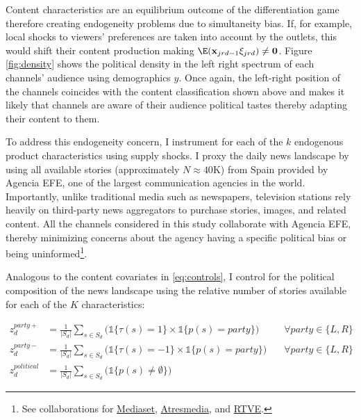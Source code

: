 \documentclass[12pt]{article}
\begin{document}
	
	Content characteristics are an equilibrium outcome of the differentiation game therefore creating endogeneity problems due to simultaneity bias. If, for example, local shocks to viewers' preferences are taken into account by the outlets, this would shift their content production making $\E(\mathbf{x}_{jrd-1}\xi_{jrd})\neq \mathbf{0} $.  Figure \ref{fig:density} shows the political density in the left right spectrum of each channels' audience using demographics $y$. Once again, the left-right position of the channels coincides with the content classification shown above and makes it likely that channels are aware of their audience political tastes thereby adapting their content to them. 
	

	
	To address this endogeneity concern, I instrument for each of the $k$ endogenous product characteristics using supply shocks. I proxy the daily news landscape by using all available stories (approximately $N\approx40\text{K}$) from Spain provided by Agencia EFE, one of the largest communication agencies in the world. Importantly, unlike traditional media such as newspapers, television stations rely heavily on third-party news aggregators to purchase stories, images, and related content.	All the channels considered in this study collaborate with Agencia EFE, thereby minimizing concerns about the agency having a specific political bias or being uninformed\footnote{See collaborations for \href{https://www.telecinco.es/autores/agencia-efe/}{Mediaset}, \href{https://cadenaser.com/nacional/2024/09/22/el-teletexto-una-herramienta-olvidada-que-aun-perdura-en-nuestras-televisiones-cadena-ser/}{Atresmedia}, and \href{https://www.rtve.es/rtve/20130301/rtve-agencia-efe-firman-convenio-colaboracion/611440.shtml}{RTVE}.}.
	
	
	Analogous to the content covariates in \ref{eq:controls}, I control for the political composition of the news landscape using the relative number of stories available for each of the $K$ characteristics: 
	
	
	\begin{equation}\label{eq:first_stage}
		\begin{aligned}
			z_d^{party+}&= \frac{1}{|S_d|} \sum_{s \in S_d}\bigg(\mathds{1}\{\tau(s)=1\} \times \mathds{1}\{p(s)=party\} \bigg)\quad &\forall party \in \{L,R\}\\
			z_d^{party-}&= \frac{1}{|S_d|}\sum_{s \in S_d}\bigg( \mathds{1}\{\tau(s)=-1\} \times \mathds{1}\{p(s)=party\} \bigg) \quad &\forall party \in \{L,R\}\\
			z_d^{political}&=\frac{1}{|S_d|} \sum_{s \in S_d}\bigg(  \mathds{1}\{p(s)\neq\emptyset\} \bigg)
		\end{aligned}
	\end{equation} 
	
\end{document}
